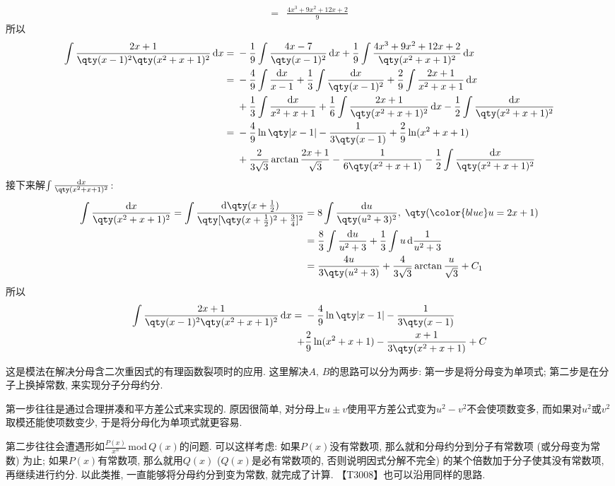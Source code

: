 \documentclass{ctexbook}
\newcommand*{\dif}{\mathop{}\!\mathrm{d}}
\newcommand{\m}{\,\mathrm{mod}\,}
\begin{document}
{\begin{align*}
={}&\frac{4x^{3}+9x^{2}+12x+2}{9}
\end{align*}
所以
\begin{align*}
\int\frac{2x+1}{\qty(x-1)^{2}\qty(x^{2}+x+1)^{2}}\dif{x}={}&-\frac{1}{9}\int\frac{4x-7}{\qty(x-1)^{2}}\dif{x}+\frac{1}{9}\int\frac{4x^{3}+9x^{2}+12x+2}{\qty(x^{2}+x+1)^{2}}\dif{x}\\
={}&-\frac{4}{9}\int\frac{\dif{x}}{x-1}+\frac{1}{3}\int\frac{\dif{x}}{\qty(x-1)^{2}}+\frac{2}{9}\int\frac{2x+1}{x^{2}+x+1}\dif{x}\\
{}&+\frac{1}{3}\int\frac{\dif{x}}{x^{2}+x+1}+\frac{1}{6}\int\frac{2x+1}{\qty(x^{2}+x+1)^{2}}\dif{x}-\frac{1}{2}\int\frac{\dif{x}}{\qty(x^{2}+x+1)^{2}}\\
={}&-\frac{4}{9}\ln\qty|x-1|-\frac{1}{3\qty(x-1)}+\frac{2}{9}\ln(x^{2}+x+1)\\
{}&+\frac{2}{3\sqrt{3}}\arctan{\frac{2x+1}{\sqrt{3}}}-\frac{1}{6\qty(x^{2}+x+1)}-\frac{1}{2}\int\frac{\dif{x}}{\qty(x^{2}+x+1)^{2}}
\end{align*}
接下来解$\int\frac{\dif{x}}{\qty(x^{2}+x+1)^{2}}$:
\begin{align*}
\int\frac{\dif{x}}{\qty(x^{2}+x+1)^{2}}=\int\frac{\dif{\qty(x+\frac{1}{2})}}{\qty[\qty(x+\frac{1}{2})^{2}+\frac{3}{4}]^{2}}={}&8\int\frac{\dif{u}}{\qty(u^{2}+3)^{2}},\;\qty(\color{blue}u=2x+1)\\
={}&\frac{8}{3}\int\frac{\dif{u}}{u^{2}+3}+\frac{1}{3}\int u\dif{\frac{1}{u^{2}+3}}\\
={}&\frac{4u}{3\qty(u^{2}+3)}+\frac{4}{3\sqrt{3}}\arctan{\frac{u}{\sqrt{3}}}+C_{1}
\end{align*}
所以
\begin{align*}
\int\frac{2x+1}{\qty(x-1)^{2}\qty(x^{2}+x+1)^{2}}\dif{x}={}&-\frac{4}{9}\ln\qty|x-1|-\frac{1}{3\qty(x-1)}\\
+{}&\frac{2}{9}\ln(x^{2}+x+1)-\frac{x+1}{3\qty(x^{2}+x+1)}+C
\end{align*}\par
{\kaishu 这是模法在解决分母含二次重因式的有理函数裂项时的应用. 这里解决$A,\,B$的思路可以分为两步: 第一步是将分母变为单项式; 第二步是在分子上换掉常数, 来实现分子分母约分. \par
第一步往往是通过合理拼凑和平方差公式来实现的. 原因很简单, 对分母上$u\pm v$使用平方差公式变为$u^{2}-v^{2}$不会使项数变多, 而如果对$u^{2}$或$v^{2}$取模还能使项数变少, 于是将分母化为单项式就更容易. \par
第二步往往会遭遇形如$\frac{P(x)}{x^{n}}\m Q(x)$的问题. 可以这样考虑: 如果$P(x)$没有常数项, 那么就和分母约分到分子有常数项 (或分母变为常数) 为止; 如果$P(x)$有常数项, 那么就用$Q(x)$ ($Q(x)$是必有常数项的, 否则说明因式分解不完全) 的某个倍数加于分子使其没有常数项, 再继续进行约分. 以此类推, 一直能够将分母约分到变为常数, 就完成了计算. 【T3008】也可以沿用同样的思路. \par}
}
\end{document}
